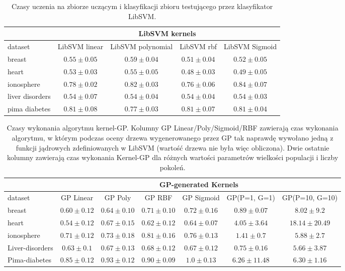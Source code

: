 \begin{table}[htbp]
\caption{Czasy uczenia na zbiorze uczącym i klasyfikacji zbioru testującego przez klasyfikator LibSVM.}
\begin{tabular}{|l|c|c|c|c|}
\hline
 & \multicolumn{ 4}{c|}{LibSVM kernels} \\ \hline
dataset & LibSVM linear & LibSVM polynomial & LibSVM rbf & LibSVM Sigmoid \\ \hline
breast & $ 0.55\pm 0.05 $ & $ 0.59\pm 0.04 $ & $ 0.51\pm 0.04 $ & $ 0.52\pm 0.05 $ \\ \hline
heart & $ 0.53\pm 0.03 $ & $ 0.55\pm 0.05 $ & $ 0.48\pm 0.03 $ & $ 0.49\pm 0.05 $ \\ \hline
ionosphere & $ 0.78\pm 0.02 $ & $ 0.82\pm 0.03 $ & $ 0.76\pm 0.06 $ & $ 0.84\pm 0.07 $ \\ \hline
liver disorders & $ 0.54\pm 0.07 $ & $ 0.54\pm 0.04 $ & $ 0.54\pm 0.04 $ & $ 0.54\pm 0.03 $ \\ \hline
pima diabetes & $ 0.81\pm 0.08 $ & $ 0.77\pm 0.03 $ & $ 0.81\pm 0.07 $ & $ 0.81\pm 0.04 $ \\ \hline
\end{tabular}
\label{tab:results-time-LSVM}
\end{table}


\begin{table}[htbp]
\caption{Czasy wykonania algorytmu kernel-GP. Kolumny GP Linear/Poly/Sigmoid/RBF zawierają czas wykonania algorytmu, w którym podczas oceny drzewa wygenerowanego przez GP tak naprawdę wywołano jedną z funkcji jądrowych zdefiniowanych w LibSVM (wartość drzewa nie była więc obliczona). Dwie ostatnie kolumny zawierają czas wykonania Kernel-GP dla różnych wartości parametrów wielkości populacji i liczby pokoleń. }
\begin{tabular}{|l|c|c|c|c|c|c|}
\hline
 & \multicolumn{ 6}{c|}{GP-generated Kernels} \\ \hline
dataset & GP Linear & GP Poly & GP RBF & GP Sigmoid & GP(P=1, G=1) & GP(P=10, G=10) \\ \hline
breast & $ 0.60\pm 0.12 $ & $ 0.64\pm 0.10 $ & $ 0.71\pm 0.10 $ & $ 0.72\pm 0.16 $ & $ 0.89\pm 0.07 $ & $ 8.02\pm 9.2 $ \\ \hline
heart & $ 0.54\pm 0.12 $ & $ 0.67\pm 0.15 $ & $ 0.62\pm 0.12 $ & $ 0.64\pm 0.07 $ & $ 4.05\pm 3.64 $ & $ 18.14\pm 20.49 $ \\ \hline
ionosphere & $ 0.71\pm 0.12 $ & $ 0.73\pm 0.18 $ & $ 0.81\pm 0.16 $ & $ 0.76\pm 0.13 $ & $ 1.41\pm 0.7 $ & $ 5.88\pm 2.7 $ \\ \hline
Liver-disorders & $ 0.63\pm 0.1 $ & $ 0.67\pm 0.13 $ & $ 0.68\pm 0.12 $ & $ 0.67\pm 0.12 $ & $ 0.75\pm 0.16 $ & $ 5.66\pm 3.87 $ \\ \hline
Pima-diabetes & $ 0.85\pm 0.12 $ & $ 0.93\pm 0.12 $ & $ 0.90\pm 0.09 $ & $ 1.0\pm 0.13 $ & $ 6.26\pm 11.48 $ & $ 6.30\pm 1.16 $ \\ \hline
\end{tabular}
\label{tab:results-time-GP}
\end{table}

